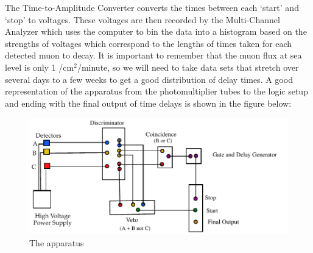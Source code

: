 \newline \indent The Time-to-Amplitude Converter converts the times between each `start' and `stop'  to voltages. These voltages are then recorded by the Multi-Channel Analyzer which uses the computer to bin the data into a histogram based on the strengths of voltages which correspond to the lengths of times taken for each detected muon to decay. It is important to remember that the muon flux at sea level is only 1 /cm$^2$/minute, so we will need to take data sets that stretch over several days to a few weeks to get a good distribution of delay times. A good representation of the apparatus from the photomultiplier tubes to the logic setup and ending with the final output of time delays is shown in the figure below: 


\begin{figure}[H]
\begin{center}
\includegraphics[width=6 in]{ML-figure1.pdf}
\caption{The apparatus}
\end{center}
\end{figure}

